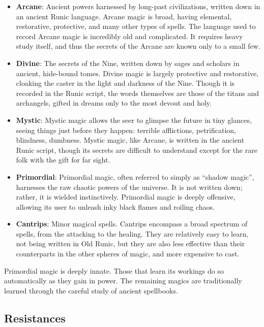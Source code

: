 \begin{itemize}
\item {\bf Arcane}: Ancient powers harnessed by long-past civilizations,
written down in an ancient Runic language.  Arcane magic is broad, having
elemental, restorative, protective, and many other types of spells.  The
language used to record Arcane magic is incredibly old and complicated.  It
requires heavy study itself, and thus the secrets of the Arcane are known
only to a small few.
\item {\bf Divine}: The secrets of the Nine, written down by sages and
scholars in ancient, hide-bound tomes.  Divine magic is largely
protective and restorative, cloaking the caster in the light and darkness
of the Nine.  Though it is recorded in the Runic script, the words
themselves are those of the titans and archangels, gifted in dreams only
to the most devout and holy.
\item {\bf Mystic}: Mystic magic allows the seer to glimpse the future in
tiny glances, seeing things just before they happen: terrible afflictions,
petrification, blindness, dumbness.  Mystic magic, like Arcane, is written
in the ancient Runic script, though its secrets are difficult to understand
except for the rare folk with the gift for far sight.
\item {\bf Primordial}: Primordial magic, often referred to simply as
``shadow magic'', harnesses the raw chaotic powers of the universe.  It is 
not written down; rather, it is wielded instinctively.  Primordial magic is
deeply offensive, allowing its user to unleash inky black flames and roiling
chaos.
\item {\bf Cantrips}: Minor magical spells.  Cantrips encompass a broad
spectrum of spells, from the attacking to the healing.  They are relatively
easy to learn, not being written in Old Runic, but they are also less
effective than their counterparts in the other spheres of magic, and more
expensive to cast.

\end{itemize}

Primordial magic is deeply innate.  Those that learn its workings do so
automatically as they gain in power.  The remaining magics are
traditionally learned through the careful study of ancient spellbooks.

\subsection{Resistances}

